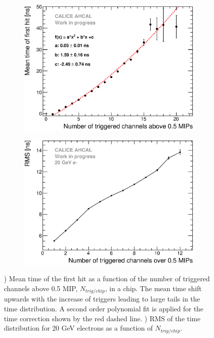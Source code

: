 \documentclass{JINST}
\begin{document}
\begin{figure}[htbp!]
  \begin{subfigure}[t]{0.49\textwidth}
    \centering
    \includegraphics[width=1\linewidth]{fig/NumberHits_Dependance_AllEnergies.eps}
    \caption{} \label{fig:nhits_profile}
  \end{subfigure}
  \hfill
  \begin{subfigure}[t]{0.49\textwidth}
    \centering
    \includegraphics[width=1\linewidth]{fig/ParametrisationPedestalShift_20GeV.eps}
    \caption{} \label{fig:nhits_RMS_profile}
  \end{subfigure}
  \caption{) Mean time of the first hit as a function of the number of triggered channels above 0.5 MIP, $N_{trig/chip}$, in a chip. The mean time shift upwards with the increase of triggers leading to large tails in the time distribution. A second order polynomial fit is applied for the time correction shown by the red dashed line. ) RMS of the time distribution for 20 GeV electrons as a function of  $N_{trig/chip}$.}
\end{figure}
\end{document}
